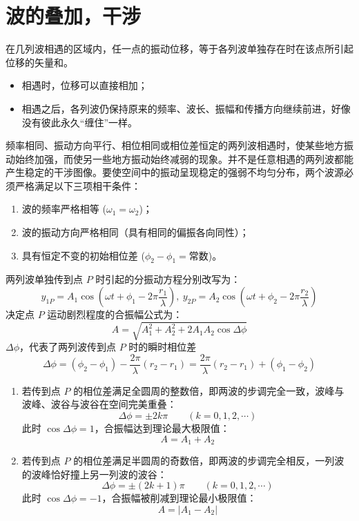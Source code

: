 

\section{波的叠加，干涉}

\begin{definition}[波的叠加原理]
在几列波相遇的区域内，任一点的振动位移，等于各列波单独存在时在该点所引起位移的矢量和。
\begin{itemize}
 \item 相遇时，位移可以直接相加；
 \item 相遇之后，各列波仍保持原来的频率、波长、振幅和传播方向继续前进，好像没有彼此永久“缠住”一样。
\end{itemize}
\end{definition}

\begin{definition}[波的干涉]
频率相同、振动方向平行、相位相同或相位差恒定的两列波相遇时，使某些地方振动始终加强，而使另一些地方振动始终减弱的现象。并不是任意相遇的两列波都能产生稳定的干涉图像。要使空间中的振动呈现稳定的强弱不均匀分布，两个波源必须严格满足以下三项相干条件：
\begin{enumerate}
\item 波的频率严格相等 ($\omega_1 = \omega_2$)；
\item 波的振动方向严格相同（具有相同的偏振各向同性）；
\item 具有恒定不变的初始相位差 ($\phi_2 - \phi_1 = \text{常数}$)。
\end{enumerate}
两列波单独传到点 $P$ 时引起的分振动方程分别改写为：$$y_{1P} = A_1 \cos\left(\omega t + \phi_1 - 2\pi \frac{r_1}{\lambda}\right),~y_{2P} = A_2 \cos\left(\omega t + \phi_2 - 2\pi \frac{r_2}{\lambda}\right)$$
决定点 $P$ 运动剧烈程度的合振幅公式为：$$\boxed{A = \sqrt{A_1^2 + A_2^2 + 2A_1 A_2 \cos\Delta\phi}}$$ $\Delta\phi$，代表了两列波传到点 $P$ 时的瞬时相位差$$\Delta\phi = (\phi_2 - \phi_1) - \frac{2\pi}{\lambda}(r_2 - r_1)= \frac{2\pi}{\lambda}(r_2 - r_1) + (\phi_1 - \phi_2)$$
\begin{enumerate}
    \item 若传到点 $P$ 的相位差满足全圆周的整数倍，即两波的步调完全一致，波峰与波峰、波谷与波谷在空间完美重叠：$$\Delta\phi = \pm 2k\pi \qquad (k = 0,1,2,\cdots)$$此时 $\cos\Delta\phi = 1$，合振幅达到理论最大极限值：$$\boxed{A = A_1 + A_2}$$
    \item 若传到点 $P$ 的相位差满足半圆周的奇数倍，即两波的步调完全相反，一列波的波峰恰好撞上另一列波的波谷：$$\Delta\phi = \pm (2k + 1)\pi \qquad (k = 0,1,2,\cdots)$$此时 $\cos\Delta\phi = -1$，合振幅被削减到理论最小极限值：$$\boxed{A = |A_1 - A_2|}$$

\end{enumerate}
\end{definition}
